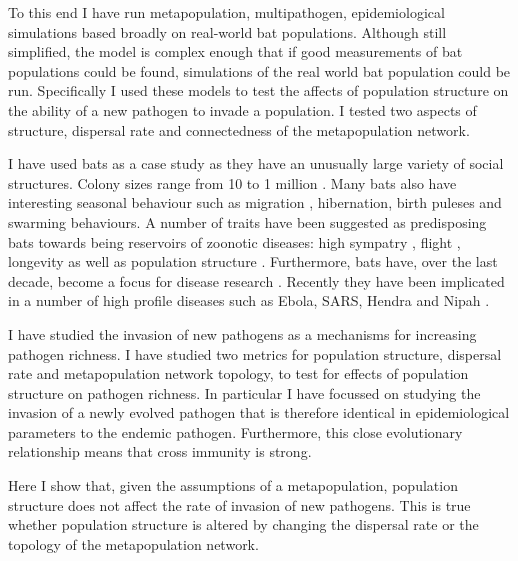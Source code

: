 To this end I have run metapopulation, multipathogen, epidemiological simulations based broadly on real-world bat populations.
Although still simplified, the model is complex enough that if good measurements of bat populations could be found, simulations of the real world bat population could be run.
Specifically I used these models to test the affects of population structure on the ability of a new pathogen to invade a population.
I tested two aspects of structure, dispersal rate and connectedness of the metapopulation network.


I have used bats as a case study as they have an unusually large variety of social structures.
Colony sizes range from 10 to 1 million \cite{jones2009pantheria}.
Many bats also have interesting seasonal behaviour such as migration \cite{richter2008first, fleming2003ecology}, hibernation, birth puleses and swarming behaviours.
A number of traits have been suggested as predisposing bats towards being reservoirs of zoonotic diseases: high sympatry \cite{luis2013comparison}, flight \cite{wang2011mass}, longevity \cite{wang2011mass} as well as population structure \cite{maganga2014bat, turmelle2009correlates, gay2014parasite}.
Furthermore, bats have, over the last decade, become a focus for disease research  \cite{calisher2006bats, hughes2007emerging}.
Recently they have been implicated in a number of high profile diseases such as Ebola, SARS, Hendra and Nipah  \cite{calisher2006bats, li2005bats}.





I have studied the invasion of new pathogens as a mechanisms for increasing pathogen richness.
I have studied two metrics for population structure, dispersal rate and metapopulation network topology, to test for effects of population structure on pathogen richness.
In particular I have focussed on studying the invasion of a newly evolved pathogen that is therefore identical in epidemiological parameters to the endemic pathogen.
Furthermore, this close evolutionary relationship means that cross immunity is strong.


Here I show that, given the assumptions of a metapopulation, population structure does not affect the rate of invasion of new pathogens.
This is true whether population structure is altered by changing the dispersal rate or the topology of the metapopulation network.





